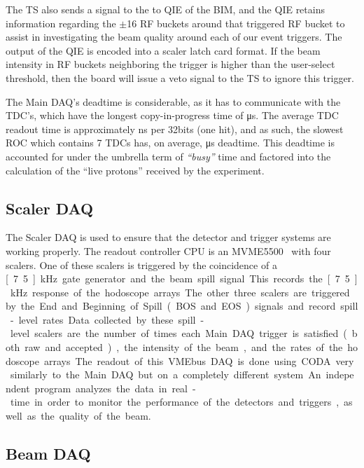 The TS also sends a signal to the to QIE of the BIM, and the QIE retains information regarding the $\pm$16 RF buckets around that triggered RF bucket to assist in investigating the beam quality around each of our event triggers. The output of the QIE is encoded into a scaler latch card format. If the beam intensity in RF buckets neighboring the trigger is higher than the user-select threshold, then the board will issue a veto signal to the TS to ignore this trigger.

The Main DAQ's deadtime is considerable, as it has to communicate with the TDC's, which have the longest copy-in-progress time of \unit[32]{\us}. The average TDC readout time is approximately \unit[300]{ns} per 32bits (one hit), and as such, the slowest ROC which contains 7 TDCs has, on average, \unit[150]{\us} deadtime. This deadtime is accounted for under the umbrella term of \emph{``busy''} time and factored into the calculation of the ``live protons'' received by the experiment.

\subsection{Scaler DAQ}

The Scaler DAQ is used to ensure that the detector and trigger systems are working properly. The readout controller CPU is an MVME5500~\cite{mvme:scaler} with four scalers. One of these scalers is triggered by the coincidence of a \unit[7.5]{kHz} gate generator and the beam spill signal. This records the \unit[7.5]{kHz} response of the hodoscope arrays. The other three scalers are triggered by the End and Beginning of Spill (BOS and EOS) signals and record spill-level rates. Data collected by these spill-level scalers are the number of times each Main DAQ trigger is satisfied (both raw and accepted), the intensity of the beam, and the rates of the hodoscope arrays. The readout of this VMEbus DAQ is done using CODA very similarly to the Main DAQ but on a completely different system. An independent program analyzes the data in real-time in order to monitor the performance of the detectors and triggers, as well as the quality of the beam. 


\subsection{Beam DAQ}

